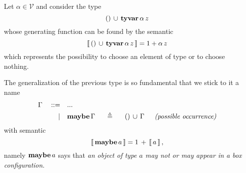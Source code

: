 \begin{example}
Let $\alpha\in\mathcal{V}$ and consider the type
\begin{displaymath}
    ()\,\cup\,\textbf{tyvar}\,\alpha\,z
\end{displaymath}
whose generating function can be found by the semantic
\begin{displaymath}
    \left\llbracket\,()\,\cup\,\textbf{tyvar}\,\alpha\,z\,\right\rrbracket = 1 + \alpha\,z
\end{displaymath}
which represents the possibility to choose an element of type \tyvar{\alpha} or
to choose nothing.
\end{example}

\begin{definition}[\maybe{\gamma}]
The generalization of the previous type is so fundamental that we stick to it a name
\begin{displaymath}
\begin{split}
    \Gamma\quad::=\quad&... \\
           |\quad&\tydef{\maybe{\Gamma}}{\tydu{\tyunit}{\Gamma}}{possible occurrence}
\end{split}
\end{displaymath}
with semantic
\begin{displaymath}
    \left\llbracket\,\textbf{maybe}\,a\,\right\rrbracket = 1\,+\,\left\llbracket\,a\,\right\rrbracket,
\end{displaymath}
namely $\textbf{maybe}\,a$ says that \textit{an object of type $a$
may not or may appear in a box configuration}.
\end{definition}

